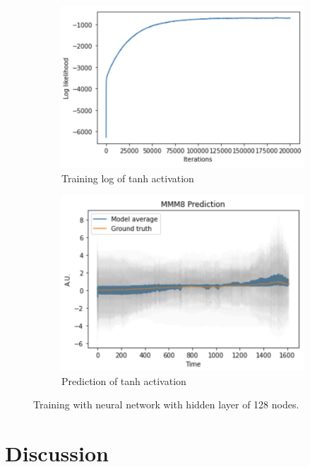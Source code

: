 \documentclass{article}
\begin{document}
\begin{figure}
    \begin{subfigure}[b]{0.5\textwidth}
        \centering
        \includegraphics[width=\textwidth]{../img/training_Langevin_200000_128.png}
        \caption{Training log of tanh activation}
    \end{subfigure}\hfill
    \begin{subfigure}[b]{0.5\textwidth}
        \centering
        \includegraphics[trim={0 0 0 0.7cm}, clip, width=\textwidth]{../img/prediction_Langevin_200000_128.png}
        \caption{Prediction of tanh activation}
    \end{subfigure}
    \caption{Training with neural network with hidden layer of 128 nodes.}
\end{figure}

\section{Discussion}
\end{document}
